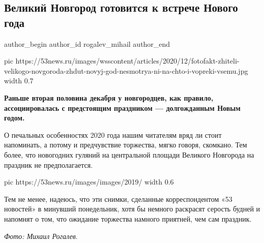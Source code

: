  
 
 
 
 
 
\subsection{Великий Новгород готовится к встрече Нового года}
\label{sec:16_12_2020.news.ru.53news.rogalev_mihail.1.velikii_novgorod_novyy_god}
\ifcmt
	author_begin
   author_id rogalev_mihail
	author_end
\fi


\ifcmt
pic https://53news.ru/images/wsscontent/articles/2020/12/fotofakt-zhiteli-velikogo-novgoroda-zhdut-novyj-god-nesmotrya-ni-na-chto-i-vopreki-vsemu.jpg
width 0.7
\fi

\textbf{Раньше вторая половина декабря у новгородцев, как правило, ассоциировалась с
предстоящим праздником — долгожданным Новым годом.}

О печальных особенностях 2020 года нашим читателям вряд ли стоит напоминать, а
потому и предчувствие торжества, мягко говоря, скомкано. Тем более, что
новогодних гуляний на центральной площади Великого Новгорода на праздник не
предполагается.

\ifcmt
pic https://53news.ru/images/images/2019/%
width 0.6
\fi

Тем не менее, надеюсь, что эти снимки, сделанные корреспондентом «53 новостей» в минувший понедельник, хотя бы немного раскрасят серость будней и напомнят о том, что ожидание торжества намного приятней, чем сам праздник.

\emph{Фото: Михаил Рогалев}.

